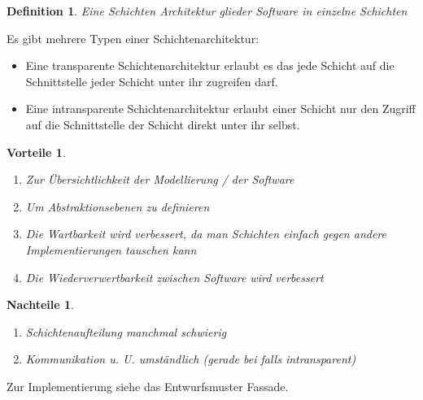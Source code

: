 \documentclass[a4paper]{article}
\theoremstyle{break}
\newtheorem{defi}{Definition}[section]
\newtheorem{why}{Vorteile}[section]
\newtheorem{whynot}{Nachteile}[section]
\begin{document}
\begin{defi}
	Eine Schichten Architektur glieder Software in einzelne Schichten
\end{defi}
Es gibt mehrere Typen einer Schichtenarchitektur: 
\begin{itemize}
	\item Eine transparente Schichtenarchitektur erlaubt es das jede Schicht auf die Schnittstelle jeder Schicht unter ihr zugreifen darf.
	\item Eine intransparente Schichtenarchitektur erlaubt einer Schicht nur den Zugriff auf die Schnittstelle der Schicht direkt unter ihr selbst.
\end{itemize}

\begin{why}
	\begin{enumerate}
		\item Zur Übersichtlichkeit der Modellierung / der Software
		\item Um Abstraktionsebenen zu definieren
		\item Die Wartbarkeit wird verbessert, da man Schichten einfach gegen andere Implementierungen tauschen kann
		\item Die Wiederverwertbarkeit zwischen Software wird verbessert
		
	\end{enumerate}
\end{why}
\begin{whynot}
	\begin{enumerate}
		\item Schichtenaufteilung manchmal schwierig
		\item Kommunikation u. U. umständlich (gerade bei falls intransparent)
	\end{enumerate}
\end{whynot}
Zur Implementierung siehe das Entwurfsmuster Fassade.
\end{document}

